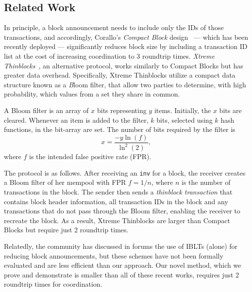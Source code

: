 \subsection{Related Work} 
In principle, a block announcement needs to include only the IDs of those transactions,
and accordingly, Corallo's {\em Compact Block} design~\cite{Corallo:2016} --- which has been recently deployed --- significantly reduces block size by including a  transaction ID list at the cost of increasing coordination to 3 roundtrip times.
%
{\em Xtreme Thinblocks}~\cite{Tschipper:2016}, an alternative protocol, works similarly to Compact Blocks but has greater data overhead. Specifically, Xtreme Thinblocks utilize a compact data structure known as a {\emph Bloom filter}, that allow two parties to determine, with high probability, which values from a set they share in common. 

 A Bloom filter is an array of $x$ bits
representing $y$ items. Initially, the $x$ bits are cleared. Whenever
an item is added to the filter, $k$ bits, selected using $k$ hash functions, in the bit-array are set. The number of bits
required by the filter is 
\begin{equation}
x =\frac{-y\ln(f)}{\ln^2(2)}, 
\end{equation}
where $f$ is
the intended false positive rate (FPR). 

 The protocol is as follows. After receiving an {\tt inv} for a
 block, the receiver creates a Bloom filter of her mempool with FPR
 $f=1/n$, where $n$ is the number of transactions in the block. The
 sender then sends a \textit{thinblock transaction} that contains
 block header information, all transaction IDs in the block and any
 transactions that do not pass through the Bloom filter, enabling the
 receiver to recreate the block.
 As a result, Xtreme Thinblocks are larger than Compact Blocks but require just 2 roundtrip times. 
 
 Relatedly, the community has discussed in forums the use of IBLTs (alone) for reducing block announcements\cite{andresen:2014,Russel:2014}, but these schemes have not been formally evaluated and are less efficient than our approach. Our novel method, which we prove and demonstrate is smaller than all of these recent works, requires just 2 roundtrip times for coordination.

